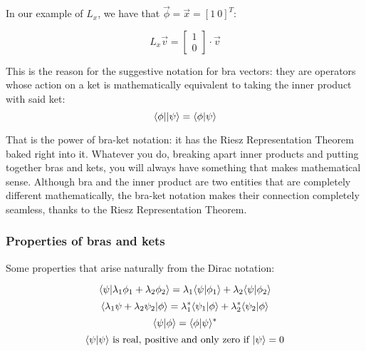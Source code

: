 In our example of $L_x$, we have that $\vec{\phi} = \vec{x} = [1\ 0]^T$:

\begin{equation}
    L_x\vec{v} = \begin{bmatrix}
        1 \\ 0
    \end{bmatrix}\cdot \vec{v}    
\end{equation}

This is the reason for the suggestive notation for bra vectors: they are operators whose action on a ket is mathematically equivalent to taking the inner product with said ket:
\begin{equation}
    \langle\phi||\psi\rangle = \langle\phi|\psi\rangle
\end{equation}

That is the power of bra-ket notation: it has the Riesz Representation Theorem baked right into it. Whatever you do, breaking apart inner products and putting together bras and kets, you will always have something that makes mathematical sense. Although bra and the inner product are two entities that are completely different mathematically, the bra-ket notation makes their connection completely seamless, thanks to the Riesz Representation Theorem.


\subsubsection{Properties of bras and kets}

Some properties that arise naturally from the Dirac notation:

\begin{equation}
    \langle\psi|\lambda_1\phi_1+\lambda_2\phi_2\rangle = \lambda_1\langle\psi|\phi_1\rangle + \lambda_2\langle\psi|\phi_2\rangle
\end{equation}
\begin{equation}
    \langle\lambda_1\psi+\lambda_2\psi_2|\phi\rangle = \lambda_1^*\langle\psi_1|\phi\rangle + \lambda_2^*\langle\psi_2|\phi\rangle
\end{equation}
\begin{equation}
    \langle\psi|\phi\rangle = \langle\phi|\psi\rangle^*
\end{equation}
\begin{equation}
    \langle\psi|\psi\rangle\text{ is real, positive and only zero if }|\psi\rangle = 0
\end{equation}


